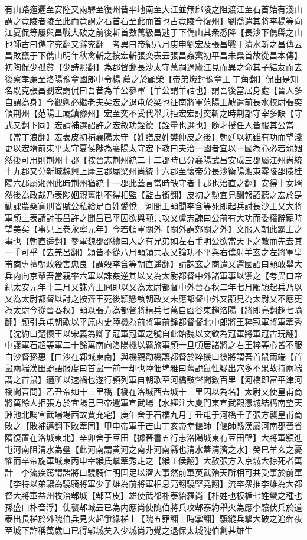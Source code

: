 有山路迤邐至安陸又兩驛至復州皆平地南至大江並無邱陵之阻渡江至石首始有淺山謂之竟陵者陵至此而竟謂之石首石至此而首也古竟陵今復州】劉喬遣其將李楊等向江夏侃等屢與昌戰大破之前後斬首數萬級昌逃于下儁山其衆悉降【長沙下儁縣之山也師古曰儁字兖翻又辭兖翻　考異曰帝紀八月庚申劉宏及張昌戰于清水斬之昌傳云昌敗竄于下儁山明年秋禽斬之按宏斬張奕表云張昌姦黨初平昌未梟首故從昌本傳】初陶侃少孤貧【少詩照翻】為郡督郵長沙太守萬嗣過廬江見而異之命其子結友而去後察孝亷至洛陽豫章國郎中令楊薦之於顧榮【帝弟熾封豫章王丁角翻】侃由是知名既克張昌劉宏謂侃曰吾昔為羊公參軍【羊公謂羊祜也】謂吾後當居身處【晉人多自謂為身】今觀卿必繼老夫矣宏之退屯於梁也征南將軍范陽王虓遣前長水校尉張奕領荆州【范陽王虓鎮豫州】宏至奕不受代舉兵拒宏宏討奕斬之時荆部守宰多缺【守式又翻下同】宏請補選詔許之宏叙功銓德【銓量也選也】隨才授任人皆服其公當【當丁浪翻】宏表皮初補襄陽太守【姓譜皮姓樊仲皮之後】朝廷以初雖有功而望淺更以宏壻前東平太守夏侯陟為襄陽太守宏下教曰夫治一國者宜以一國為心必若親姻然後可用則荆州十郡【按晉志荆州統二十二郡時已分襄陽武昌安成三郡屬江州尚統十九郡又分新城魏興上庸三郡屬梁州尚統十六郡至懷帝分長沙衡陽湘東零陵邵陵桂陽六郡屬湘州此時荆州猶統十一郡此蓋言當時缺守者十郡也治直之翻】安得十女壻然後為政哉乃表陟姻親舊制不得相監【監古銜翻】皮初之勲宜見酬報詔聽之宏於是勸課農桑寛刑省賦公私給足百姓愛悅　河間王顒聞李含等死即起兵討長沙王乂大將軍頴上表請討張昌許之聞昌已平因欲與顒共攻乂盧志諫曰公前有大功而委權辭寵時望美矣【事見上卷永寧元年】今若頓軍關外【關外謂郊關之外】文服入朝此霸主之事也【朝直遥翻】參軍魏郡邵續曰人之有兄弟如左右手明公欲當天下之敵而先去其一手可乎【去羌呂翻】頴皆不從八月顒頴共表乂論功不平與右僕射羊玄之左將軍皇甫商專擅朝政殺害忠良【謂殺李含等朝直遥翻】請誅玄之商遣乂還國詔曰顒敢舉大兵内向京輦吾當親率六軍以誅姦逆其以乂為太尉都督中外諸軍事以禦之【考異曰帝紀太安元年十二月乂誅齊王冏即以乂為太尉都督中外晉春秋二年七月顒頴起兵乃以乂為太尉都督以討之按齊王死後頴懸執朝政乂未應都督中外又顒見為太尉乂不應更為太尉今從晉春秋】顒以張方為都督將精兵七萬自函谷東趨洛陽【將即亮翻趨七喻翻】頴引兵屯朝歌以平原内史陸機為前將軍前鋒都督督北中郎將王粹冠軍將軍牽秀【沈約曰楚懷王以宋義為卿子冠軍冠軍之號自此始魏以文欽為冠軍將軍冠古玩翻】中護軍石超等軍二十餘萬南向洛陽機以羇旅事頴一旦頓居諸將之右王粹等心皆不服白沙督孫惠【白沙在鄴城東南】與機親勸機讓都督於粹機曰彼將謂吾首鼠兩端【首鼠兩端漢田蚡語服䖍曰首鼠一前一却也陸佃埤雅曰舊說鼠性疑出穴多不果故持兩端謂之首鼠】適所以速禍也遂行頴列軍自朝歌至河橋鼓聲聞數百里【河橋即富平津河橋聞音問】乙丑帝如十三里橋【橋在洛城西去城十三里因以為名】太尉乂使皇甫商將萬餘人拒張方於宜陽己巳帝還軍宣武場【水經注大夏門東宣武觀憑城結構南望天淵池北矚宣武場場西故賈充宅】庚午舍于石樓九月丁丑屯于河橋壬子張方襲皇甫商敗之【敗補邁翻下敗牽同】甲申帝軍于芒山丁亥帝幸偃師【偃師縣漢屬河南郡晉省隋復置在洛城東北】辛卯舍于豆田【據晉書五行志洛陽城東有豆田壁】大將軍頴進屯河南阻清水為壘【此河南謂黄河之南非河南縣也清水蓋清濟之水】癸巳羊玄之憂懼而卒帝旋軍城東丙申幸緱氏擊牽秀走之【緱工侯翻】大赦張方入京城大掠死者萬計　李流疾篤謂諸將曰驍騎仁明固足以濟大事然前軍英武殆天所相可共受事於前軍【李特以弟驤為驍騎將軍少子雄為前將軍相息亮翻驍堅堯翻】流卒衆推李雄為大都督大將軍益州牧治郫城【郫音皮】雄使武都朴泰紿羅尚【朴姓也板楯七姓蠻之種也孫盛曰朴音浮】使襲郫城云已為内應尚使隗伯將兵攻郫泰約舉火為應李驤伏兵於道泰出長梯於外隗伯兵見火起爭緣梯上【隗五罪翻上時掌翻】驤縱兵擊大破之追犇夜至城下詐稱萬歲曰已得郫城矣入少城尚乃覺之退保太城隗伯創甚雄生